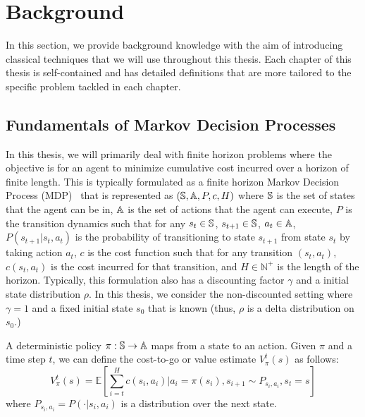 \section{Background}
\label{sec:background}

In this section, we provide background knowledge with the aim of
introducing classical techniques
that we will use throughout this thesis. Each chapter of this thesis
is self-contained and has detailed definitions that are more tailored
to the specific problem tackled in each chapter.

\subsection{Fundamentals of Markov Decision Processes}
\label{sec:fund-mark-decis}

In this thesis, we will primarily deal with finite horizon problems
where the objective is for an agent to minimize cumulative cost incurred over a
horizon of finite length. This is typically formulated as a finite horizon Markov
Decision Process (MDP)~\cite{bellman} that is represented as
$(\mathbb{S}, \mathbb{A}, P, c, H)$ where $\mathbb{S}$ is the set
of states that the agent can be in, $\mathbb{A}$ is the set of
actions that the agent can execute, $P$ is the transition dynamics
such that for any $s_t \in \mathbb{S}$, $s_{t+1} \in \mathbb{S}$,
$a_t \in \mathbb{A}$, $P(s_{t+1}|s_t, a_t)$ is the probability of
transitioning to state $s_{t+1}$ from state $s_t$ by taking action
$a_t$, $c$ is the cost function such that for any transition $(s_t,
a_t)$, $c(s_t, a_t)$ is the cost incurred for that transition, and $H
\in \mathbb{N}^+$ is the length of the horizon. Typically, this
formulation also has a discounting factor $\gamma$ and a initial state
distribution $\rho$. In this thesis, we consider the non-discounted
setting where $\gamma = 1$ and a fixed initial state $s_0$ that is
known (thus, $\rho$ is a delta distribution on $s_0$.)

A deterministic policy $\pi: \mathbb{S} \rightarrow \mathbb{A}$
maps from a state to an action. Given $\pi$ and a time step $t$, we can define the 
cost-to-go or value estimate $V_\pi^t(s)$ as follows:
\begin{equation}
  \label{eq:3}
  V_\pi^t(s) = \mathbb{E}\left[ \sum_{i=t}^H c(s_i, a_i) | a_i =
    \pi(s_i), s_{i+1} \sim P_{s_i, a_i}, s_t = s \right]
\end{equation}
where $P_{s_i, a_i} = P(\cdot|s_i, a_i)$ is a distribution over the
next state.

